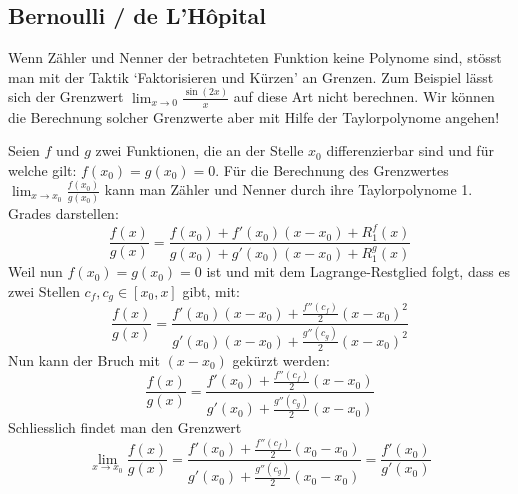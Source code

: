 \clearpage
\subsection{Bernoulli / de L'Hôpital}

Wenn Zähler und Nenner der betrachteten Funktion keine Polynome sind, stösst man mit der Taktik   `Faktorisieren und Kürzen'  an Grenzen. Zum Beispiel lässt sich der Grenzwert $\lim_{x\rightarrow0} \frac{\sin(2x)}{x} $ auf diese Art nicht berechnen. Wir können die Berechnung solcher Grenzwerte aber mit Hilfe der Taylorpolynome angehen!

Seien $f$ und $g$ zwei Funktionen, die an der Stelle $x_0$ differenzierbar sind und für welche gilt: $f(x_0) = g(x_0) = 0$. Für die Berechnung des Grenzwertes $\lim_{x\rightarrow x_0} \frac{f(x_0)}{g(x_0)} $ kann man Zähler und Nenner durch ihre Taylorpolynome 1. Grades darstellen:
$$\frac{f(x)}{g(x)} = \frac{f(x_0) + f'(x_0)(x-x_0) + R^f_1(x)}{g(x_0) + g'(x_0)(x-x_0) + R^g_1(x)}$$
Weil nun $f(x_0) = g(x_0) = 0$ ist und mit dem Lagrange-Restglied folgt, dass es zwei Stellen $c_f, c_g \in [x_0, x]$ gibt, mit:
$$\frac{f(x)}{g(x)} = \frac{f'(x_0)(x-x_0) + \frac{f''(c_f)}{2} (x-x_0)^2}{ g'(x_0)(x-x_0) + \frac{g''(c_g)}{2}(x-x_0)^2}$$
Nun kann der Bruch mit $(x-x_0)$ gekürzt werden:
$$\frac{f(x)}{g(x)} = \frac{f'(x_0) + \frac{f''(c_f)}{2} (x-x_0)}{ g'(x_0) + \frac{g''(c_g)}{2}(x-x_0)}$$
Schliesslich findet man den Grenzwert
$$\lim_{{x \to x_0}} \frac{f(x)}{g(x)} = \frac{f'(x_0) + \frac{f''(c_f)}{2} (x_0-x_0)}{ g'(x_0) + \frac{g''(c_g)}{2}(x_0-x_0)} = \frac{f'(x_0)}{g'(x_0)}$$



